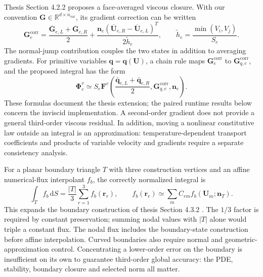 \documentclass[11pt]{article}
\newcommand{\U}{\bm{U}}
\newcommand{\dd}{\mathrm{d}}
\begin{document}
Thesis Section 4.2.2 \cite{ma2026thesis} proposes a face-averaged viscous closure.  With our convention $\bm G\in\mathbb R^{d\times n_{\mathrm{var}}}$, its gradient correction can be written
\begin{equation}
 \bm G_e^{\mathrm{corr}}=\frac{\overline{\bm G}_{e,L}+\overline{\bm G}_{e,R}}{2}
  +\frac{\bm n_e(\overline{\U}_{e,R}-\overline{\U}_{e,L})^T}{2\tilde h_e},
 \qquad \tilde h_e=\frac{\min(V_i,V_j)}{S_e}.
 \label{eq:viscous-jump}
\end{equation}
The normal-jump contribution couples the two states in addition to averaging gradients.  For primitive variables $\bm q=\bm q(\U)$, a chain rule maps $\bm G_e^{\mathrm{corr}}$ to $\bm G_{q,e}^{\mathrm{corr}}$, and the proposed integral has the form
\begin{equation}
 \bm\Phi^{v}_e\simeq
 S_e\bm F^v\!\left(
       \frac{\bar{\bm q}_{e,L}+\bar{\bm q}_{e,R}}2,\bm G_{q,e}^{\mathrm{corr}},\bm n_e\right).
 \label{eq:viscous-mean}
\end{equation}
These formulas document the thesis extension; the paired runtime results below concern the inviscid implementation.  A second-order gradient does not provide a general third-order viscous residual.  In addition, moving a nonlinear constitutive law outside an integral is an approximation: temperature-dependent transport coefficients and products of variable velocity and gradients require a separate consistency analysis.

For a planar boundary triangle $T$ with three construction vertices and an affine numerical-flux interpolant $f_b$, the correctly normalized integral is
\begin{equation}
 \int_T f_b\,\dd S=\frac{|T|}{3}\sum_{r=1}^3 f_b(\bm r_r),
 \qquad
 f_b(\bm r_r)\simeq\sum_m C_{rm}f_b(\U_m;\bm n_T).
 \label{eq:boundary-affine}
\end{equation}
This expands the boundary construction of thesis Section 4.3.2 \cite{ma2026thesis}.  The $1/3$ factor is required by constant preservation; summing nodal values with $|T|$ alone would triple a constant flux.  The nodal flux includes the boundary-state construction before affine interpolation.  Curved boundaries also require normal and geometric-approximation control.  Concentrating a lower-order error on the boundary is insufficient on its own to guarantee third-order global accuracy: the PDE, stability, boundary closure and selected norm all matter.
\end{document}

